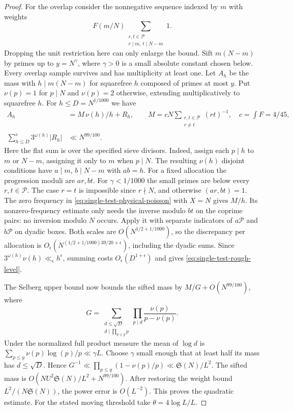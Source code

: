 \documentclass[11pt,a4paper]{article}
\numberwithin{equation}{section}
\newcommand{\SSS}{\mathfrak S}
\begin{document}
\begin{proof}
For the overlap consider the nonnegative sequence indexed by $m$
with weights
\[
 F(m/N)\sum_{\substack{r,t\in\mathcal P\\r\mid m,\ t\mid N-m}}1 .
\]
Dropping the unit restriction here can only enlarge the bound. Sift
$m(N-m)$ by primes up to $y=N^\gamma$, where $\gamma>0$ is a small
absolute constant chosen below. Every overlap sample survives and
has multiplicity at least one. Let $A_h$ be the mass with
$h\mid m(N-m)$ for squarefree $h$ composed of primes at most $y$.
Put $\nu(p)=1$ for $p\mid N$ and $\nu(p)=2$ otherwise, extending
multiplicatively to squarefree $h$. For $h\le D=N^{1/1000}$ we have
\begin{align}
 A_h &= M\,\nu(h)/h + R_h,\qquad
 M=cN\sum_{\substack{r,t\in\mathcal P\\r\ne t}}(rt)^{-1},
 \quad c=\int F=4/45,\nonumber\\
 \sum_{h\le D}^{\flat}3^{\omega(h)}|R_h|&\ll N^{99/100}.
 \label{eq:single-test-rough-level}
\end{align}
Here the flat sum is over the specified sieve divisors. Indeed,
assign each $p\mid h$ to $m$ or $N-m$, assigning it only to $m$
when $p\mid N$. The resulting $\nu(h)$ disjoint conditions have
$a\mid m$, $b\mid N-m$ with $ab=h$. For a fixed allocation the
progression moduli are $ar,bt$. For $\gamma<1/1000$ the small
primes are below every $r,t\in\mathcal P$. The case $r=t$ is
impossible since $r\nmid N$, and otherwise $(ar,bt)=1$.
The zero frequency in \eqref{eq:single-test-physical-poisson}
with $X=N$ gives $M/h$. Its nonzero-frequency estimate only needs
the inverse modulo $bt$ on the coprime pairs: no inversion modulo
$N$ occurs. Apply it with separate indicators of $a\mathcal P$
and $b\mathcal P$ on dyadic boxes. Both scales are
$O(N^{1/2+1/1000})$, so the discrepancy per allocation is
$O_\epsilon(N^{(1/2+1/1000)39/20+\epsilon})$, including the
dyadic sums. Since $3^{\omega(h)}\nu(h)\ll_\epsilon h^\epsilon$,
summing costs $O_\epsilon(D^{1+\epsilon})$ and gives
\eqref{eq:single-test-rough-level}.

The Selberg upper bound \cite[Theorem~9.1]{Richert} now bounds
the sifted mass by $M/G+O(N^{99/100})$, where
\[
 G=\sum_{\substack{d\le\sqrt D\\d\mid\prod_{p\le y}p}}
       \prod_{p\mid d}\frac{\nu(p)}{p-\nu(p)} .
\]
Under the normalized full product measure the mean of $\log d$
is $\sum_{p\le y}\nu(p)\log(p)/p\ll\gamma L$. Choose $\gamma$
small enough that at least half its mass has $d\le\sqrt D$.
Hence $G^{-1}\ll\prod_{p\le y}(1-\nu(p)/p)\ll\SSS(N)/L^2$.
The sifted mass is $O(N U^2\SSS(N)/L^2+N^{99/100})$.
After restoring the weight bound $L^2/(N\SSS(N))$, the power
error is $O(L^{-2})$. This proves the quadratic estimate.
For the stated moving threshold take $\theta=4\log L/L$.
\end{proof}
\end{document}
